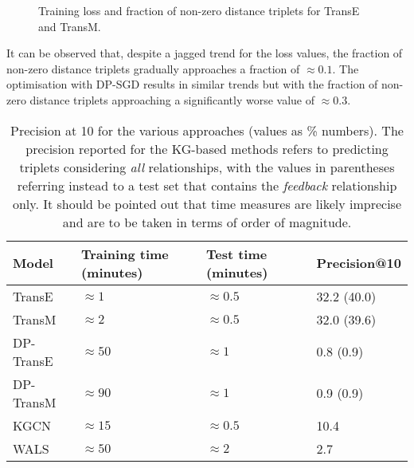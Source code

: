 \begin{figure}[htbp]
  \centering
  \caption{Training loss and fraction of non-zero distance triplets for TransE and TransM.}
\end{figure}

It can be observed that, despite a jagged trend for the loss values, the fraction of non-zero distance triplets gradually approaches a fraction of $\approx 0.1$.
The optimisation with DP-SGD results in similar trends but with the fraction of non-zero distance triplets approaching a significantly worse value of $\approx 0.3$.

\begin{table}[htbp]
  \centering
\begin{tabular}{llll}
\hline
Model&Training time (minutes)&Test time (minutes)&Precision@10\\
\hline
TransE&$\approx{1}$&$\approx{0.5}$&32.2 (40.0)\\
TransM&$\approx{2}$&$\approx{0.5}$&32.0 (39.6)\\
DP-TransE&$\approx{50}$&$\approx{1}$&0.8 (0.9)\\
DP-TransM&$\approx{90}$&$\approx{1}$&0.9 (0.9)\\
KGCN&$\approx 15$&$\approx 0.5$&10.4\\
WALS&$\approx{50}$&$\approx{2}$&2.7\\
\end{tabular}
\caption{Precision at 10 for the various approaches (values as \% numbers). The precision reported for the KG-based methods refers to predicting triplets considering \emph{all} relationships, with the values in parentheses referring instead to a test set that contains the \emph{feedback} relationship only. It should be pointed out that time measures are likely imprecise and are to be taken in terms of order of magnitude.}
\label{tab:comparison}
\end{table}


